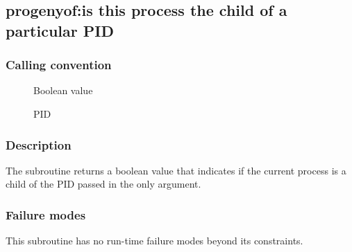 \clearpage
{}
{}
\label{subr:progenyof}
\subsection*{progenyof:is this process the child of a particular PID}

\subsubsection*{Calling convention}

\begin{description}
\item[] Boolean value
\item[] PID
\end{description}

\subsubsection*{Description}

The  subroutine returns a boolean value that
indicates if the current process is a child of the PID passed in the
only argument.

\subsubsection*{Failure modes}

This subroutine has no run-time failure modes beyond its constraints.
